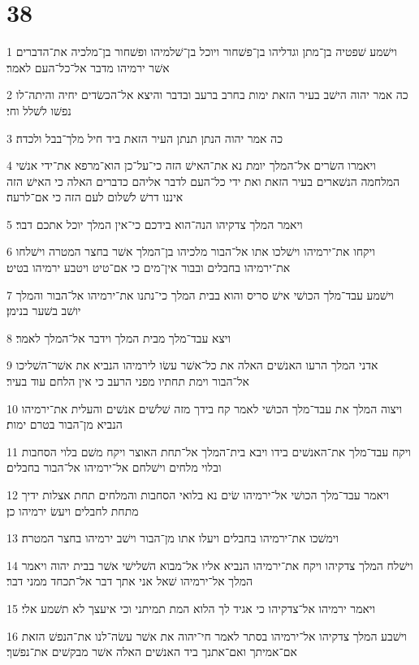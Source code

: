\chapter{38}

\par 1 וישׁמע שׁפטיה בן־מתן וגדליהו בן־פשׁחור ויוכל בן־שׁלמיהו ופשׁחור בן־מלכיה את־הדברים אשׁר ירמיהו מדבר אל־כל־העם לאמר׃
\par 2 כה אמר יהוה הישׁב בעיר הזאת ימות בחרב ברעב ובדבר והיצא אל־הכשׂדים יחיה והיתה־לו נפשׁו לשׁלל וחי׃
\par 3 כה אמר יהוה הנתן תנתן העיר הזאת ביד חיל מלך־בבל ולכדה׃
\par 4 ויאמרו השׂרים אל־המלך יומת נא את־האישׁ הזה כי־על־כן הוא־מרפא את־ידי אנשׁי המלחמה הנשׁארים בעיר הזאת ואת ידי כל־העם לדבר אליהם כדברים האלה כי האישׁ הזה איננו דרשׁ לשׁלום לעם הזה כי אם־לרעה׃
\par 5 ויאמר המלך צדקיהו הנה־הוא בידכם כי־אין המלך יוכל אתכם דבר׃
\par 6 ויקחו את־ירמיהו וישׁלכו אתו אל־הבור מלכיהו בן־המלך אשׁר בחצר המטרה וישׁלחו את־ירמיהו בחבלים ובבור אין־מים כי אם־טיט ויטבע ירמיהו בטיט׃
\par 7 וישׁמע עבד־מלך הכושׁי אישׁ סריס והוא בבית המלך כי־נתנו את־ירמיהו אל־הבור והמלך יושׁב בשׁער בנימן׃
\par 8 ויצא עבד־מלך מבית המלך וידבר אל־המלך לאמר׃
\par 9 אדני המלך הרעו האנשׁים האלה את כל־אשׁר עשׂו לירמיהו הנביא את אשׁר־השׁליכו אל־הבור וימת תחתיו מפני הרעב כי אין הלחם עוד בעיר׃
\par 10 ויצוה המלך את עבד־מלך הכושׁי לאמר קח בידך מזה שׁלשׁים אנשׁים והעלית את־ירמיהו הנביא מן־הבור בטרם ימות׃
\par 11 ויקח עבד־מלך את־האנשׁים בידו ויבא בית־המלך אל־תחת האוצר ויקח משׁם בלוי הסחבות ובלוי מלחים וישׁלחם אל־ירמיהו אל־הבור בחבלים׃
\par 12 ויאמר עבד־מלך הכושׁי אל־ירמיהו שׂים נא בלואי הסחבות והמלחים תחת אצלות ידיך מתחת לחבלים ויעשׂ ירמיהו כן׃
\par 13 וימשׁכו את־ירמיהו בחבלים ויעלו אתו מן־הבור וישׁב ירמיהו בחצר המטרה׃
\par 14 וישׁלח המלך צדקיהו ויקח את־ירמיהו הנביא אליו אל־מבוא השׁלישׁי אשׁר בבית יהוה ויאמר המלך אל־ירמיהו שׁאל אני אתך דבר אל־תכחד ממני דבר׃
\par 15 ויאמר ירמיהו אל־צדקיהו כי אגיד לך הלוא המת תמיתני וכי איעצך לא תשׁמע אלי׃
\par 16 וישׁבע המלך צדקיהו אל־ירמיהו בסתר לאמר חי־יהוה את אשׁר עשׂה־לנו את־הנפשׁ הזאת אם־אמיתך ואם־אתנך ביד האנשׁים האלה אשׁר מבקשׁים את־נפשׁך׃
